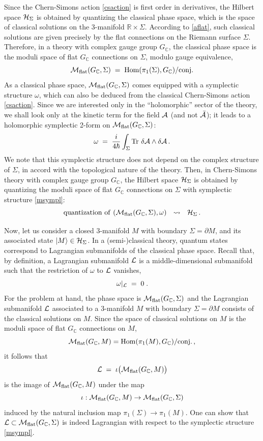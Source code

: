 \documentclass[hyper]{JHEP3}
\def\Tr{{\rm Tr}}
\def\CA {{\cal A}}
\def\CH {{\cal H}}
\def\CL {{\cal L}}
\newcommand{\C}{{\mathbb{C}}}
\newcommand{\R}{{\mathbb{R}}}
\newcommand{\M}{{{\cal M}}_{{\rm flat}}}
\newcommand\be{\begin{equation}}
\newcommand\ee{\end{equation}}
\def\={\;=\;}
\begin{document}
Since the Chern-Simons action \eqref{csaction} is first order in derivatives,
the Hilbert space $\CH_{\Sigma}$ is obtained by quantizing the classical phase space,
which is the space of classical solutions on the 3-manifold $\R \times \Sigma$.
According to \eqref{aflat}, such classical solutions are given precisely
by the flat connections on the Riemann surface $\Sigma$.
Therefore, in a theory with complex gauge group $G_{\C}$, the classical phase
space is the moduli space of flat $G_{\C}$ connections on $\Sigma$,
modulo gauge equivalence,
\be
\M (G_{\C}, \Sigma) \= {\rm Hom} (\pi_1 (\Sigma), G_{\C}) / {\rm conj.}
\label{mpspace}
\ee
As a classical phase space, $\M (G_{\C}, \Sigma)$ comes equipped
with a symplectic structure $\omega$, which can also be deduced from
the classical Chern-Simons action \eqref{csaction}.
Since we are interested only in the ``holomorphic'' sector of the theory,
we shall look only at the kinetic term for the field $\CA$ (and not $\bar \CA$);
it leads to a holomorphic symplectic 2-form on $\M (G_{\C}, \Sigma)$:
\be
\omega \= {i \over 4 \hbar} \int_{\Sigma} \Tr~ \delta \CA \wedge \delta \CA\,.
\label{msympl}
\ee
We note that this symplectic structure does not depend on the complex structure
of $\Sigma$, in accord with the topological nature of the theory.
Then, in Chern-Simons theory with complex gauge group $G_{\C}$,
the Hilbert space $\CH_{\Sigma}$ is obtained by quantizing the moduli
space of flat $G_{\C}$ connections on $\Sigma$ with symplectic structure \eqref{msympl}:
\be
{\rm quantization~of~} (\M (G_{\C}, \Sigma),\omega) ~~\leadsto~~ \CH_{\Sigma}\,.
\ee

Now, let us consider a closed 3-manifold $M$ with boundary $\Sigma = \partial M$,
and its associated state $\vert M \rangle \in \CH_{\Sigma}$.
In a (semi-)classical theory, quantum states correspond to Lagrangian submanifolds
of the classical phase space.
Recall that, by definition, a Lagrangian submanifold $\CL$ is a middle-dimensional
submanifold such that the restriction of $\omega$ to $\CL$ vanishes,
\be
\omega \vert_{\CL} \= 0\;.
\ee
For the problem at hand, the phase space is $\M (G_{\C}, \Sigma)$
and the Lagrangian submanifold $\CL$ associated to a 3-manifold $M$
with boundary $\Sigma = \partial M$ consists of the classical solutions on $M$.
Since the space of classical solutions on $M$ is the moduli space of flat
$G_{\C}$ connections on $M$,
\be
\M (G_{\C}, M) = {\rm Hom} (\pi_1 (M), G_{\C}) / {\rm conj.}\,,
\label{mflatm}
\ee
it follows that
\be
\CL \= \iota \big( \M (G_{\C}, M) \big)
\label{lpspace}
\ee
is the image of $\M (G_{\C}, M)$ under the map
\be
\iota : \M (G_{\C}, M) \to \M (G_{\C}, \Sigma)
\ee
induced by the natural inclusion map $\pi_1 (\Sigma) \to \pi_1 (M)$.
%
One can show that $\CL \subset \M (G_{\C}, \Sigma)$
is indeed Lagrangian with respect to the symplectic structure \eqref{msympl}.
\end{document}

